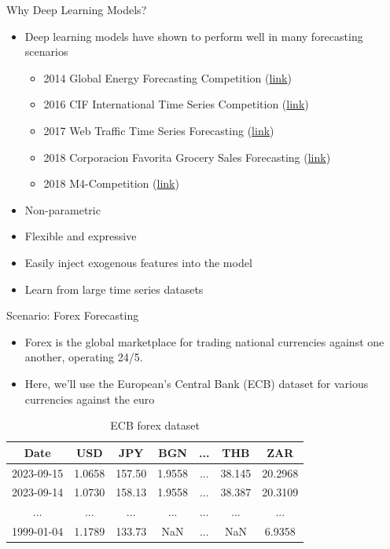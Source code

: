 \documentclass[aspectratio=169, 12pt]{beamer}
\begin{document}
\begin{frame}{Why Deep Learning Models?}
    \begin{itemize}
    \item Deep learning models have shown to perform well in many forecasting scenarios
        \begin{itemize}
            \item 2014 Global Energy Forecasting Competition (\href{https://www.crowdanalytix.com/contests/global-energy-forecasting-competition-2014-probabilistic-electricity-price-forecasting}{link})
            \item 2016 CIF International Time Series Competition (\href{https://irafm.osu.cz/cif/main.php}{link})
            \item 2017 Web Traffic Time Series Forecasting (\href{https://www.kaggle.com/c/web-traffic-time-series-forecasting#timeline}{link})
            \item 2018 Corporacion Favorita Grocery Sales Forecasting (\href{https://www.kaggle.com/c/favorita-grocery-sales-forecasting}{link})
            \item 2018 M4-Competition (\href{https://forecasters.org/blog/2017/12/21/m4-competition-1-1-2018/}{link})
        \end{itemize}
    
    \item Non-parametric
    \item Flexible and expressive
    \item Easily inject exogenous features into the model
    \item Learn from large time series datasets
\end{itemize}

\end{frame}

\begin{frame}{Scenario: Forex Forecasting}
    \begin{itemize}
        \item Forex is the global marketplace for trading national currencies against one another, operating 24/5.
        \item  Here, we'll use the European's Central Bank (ECB) dataset for various currencies against the euro
    \end{itemize}
\begin{table}[h]
\centering
\caption{ECB forex dataset}\label{tab:data}
\begin{tabular}{ccccccc}
\toprule
\textbf{Date} & \textbf{USD} & \textbf{JPY} & \textbf{BGN} & \textbf{...} & \textbf{THB} & \textbf{ZAR} \\
\midrule
2023-09-15 & 1.0658 & 157.50 & 1.9558 & ... & 38.145 & 20.2968 \\
2023-09-14 & 1.0730 & 158.13 & 1.9558 & ... & 38.387 & 20.3109 \\
... & ... & ... & ... & ... & ... & ... \\
1999-01-04 & 1.1789 & 133.73 & NaN & ... & NaN & 6.9358 \\
\bottomrule
\end{tabular}
\end{table}
\end{frame}
\end{document}
